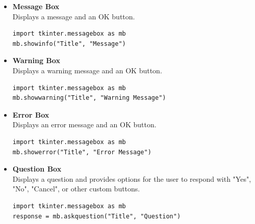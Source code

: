 \begin{itemize}
    \item \textbf{Message Box} \\
    Displays a message and an OK button.
    \vspace{0.2cm}
    \begin{codebox}
    \begin{verbatim}
import tkinter.messagebox as mb
mb.showinfo("Title", "Message")
    \end{verbatim}
    \end{codebox}
    \vspace{0.3cm}
    
    \item \textbf{Warning Box} \\
    Displays a warning message and an OK button.
    \vspace{0.2cm}
    \begin{codebox}
    \begin{verbatim}
import tkinter.messagebox as mb
mb.showwarning("Title", "Warning Message")
    \end{verbatim}
    \end{codebox}
    \vspace{0.3cm}
    
    \item \textbf{Error Box} \\
    Displays an error message and an OK button.
    \vspace{0.2cm}
    \begin{codebox}
    \begin{verbatim}
import tkinter.messagebox as mb
mb.showerror("Title", "Error Message")
    \end{verbatim}
    \end{codebox}
    \vspace{0.3cm}
    
    \item \textbf{Question Box} \\
    Displays a question and provides options for the user to respond with "Yes", "No", "Cancel", or other custom buttons.
    \vspace{0.2cm}
    \begin{codebox}
    \begin{verbatim}
import tkinter.messagebox as mb
response = mb.askquestion("Title", "Question")
    \end{verbatim}
    \end{codebox}
    \vspace{0.3cm}
    

\end{itemize}
